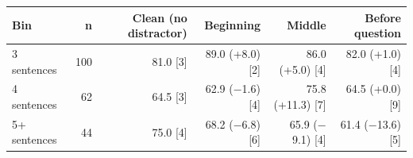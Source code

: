 \begin{tabular}{lrrrrr}
\toprule
Bin & n & Clean (no distractor) & Beginning & Middle & Before question \\
\midrule
3 sentences & 100 & 81.0 [3] & 89.0 (+8.0) [2] & 86.0 (+5.0) [4] & 82.0 (+1.0) [4] \\
4 sentences & 62 & 64.5 [3] & 62.9 ($-$1.6) [4] & 75.8 (+11.3) [7] & 64.5 (+0.0) [9] \\
5+ sentences & 44 & 75.0 [4] & 68.2 ($-$6.8) [6] & 65.9 ($-$9.1) [4] & 61.4 ($-$13.6) [5] \\
\bottomrule
\end{tabular}

